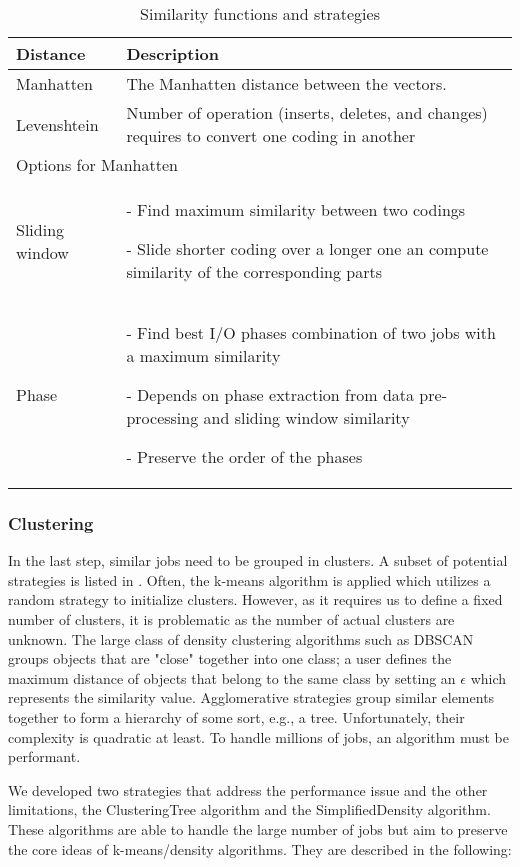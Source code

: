 \documentclass{jhps}
\begin{document}
\begin{table}
  \centering
  \begin{tabularx}{\textwidth}{lX}
    Distance & Description \\
    \hline
    Manhatten & The Manhatten distance between the vectors.\\
    \hline
    Levenshtein &  Number of operation (inserts, deletes, and changes) requires to convert one coding in another \\
    \hline
    \hline
    \multicolumn{2}{l}{Options for Manhatten} \\
    \hline
    Sliding window &  - Find maximum similarity between two codings \par
            - Slide shorter coding over a longer one an compute similarity of the corresponding parts \\
    \hline
    Phase &  - Find best I/O phases combination of two jobs with a maximum similarity \par - Depends on phase extraction from data pre-processing and sliding window similarity \par - Preserve the order of the phases \\
    \hline
  \end{tabularx}
  \caption{Similarity functions and strategies}
  \label{tab:sim_funcs}
\end{table}

\subsubsection{Clustering}
In the last step, similar jobs need to be grouped in clusters.
A subset of potential strategies is listed in .
Often, the k-means algorithm is applied which utilizes a random strategy to initialize clusters.
However, as it requires us to define a fixed number of clusters, it is problematic as the number of actual clusters are unknown.
The large class of density clustering algorithms such as DBSCAN groups objects that are "close" together into one class; a user defines the maximum distance of objects that belong to the same class by setting an $\epsilon$ which represents the similarity value.
Agglomerative strategies group similar elements together to form a hierarchy of some sort, e.g., a tree.
Unfortunately, their complexity is quadratic at least.
To handle millions of jobs, an algorithm must be performant.

We developed two strategies that address the performance issue and the other limitations, the ClusteringTree algorithm and the SimplifiedDensity algorithm.
These algorithms are able to handle the large number of jobs but aim to preserve the core ideas of k-means/density algorithms.
They are described in the following:
\end{document}
